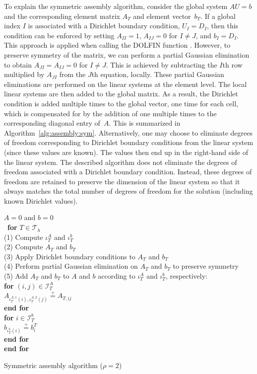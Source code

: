 To explain the symmetric assembly algorithm, consider the global
system $AU=b$ and the corresponding element matrix $A_T$ and element
vector~$b_T$. If a global index $I$ is associated with a Dirichlet
boundary condition, $U_I=D_I$, then this condition can be enforced by
setting $A_{II} = 1$, $A_{IJ} = 0$ for $I \neq J$, and $b_I =
D_I$. This approach is applied when calling the DOLFIN function
. However, to preserve symmetry of the matrix,
we can perform a partial Gaussian elimination to obtain $A_{JI} =
A_{IJ} = 0$ for $I \ne J$. This is achieved by subtracting the $I$th
row multiplied by $A_{JI}$ from the $J$th equation, locally. These
partial Gaussian eliminations are performed on the linear systems at
the element level. The local linear systems are then added to the
global matrix. As a result, the Dirichlet condition is added multiple
times to the global vector, one time for each cell, which is
compensated for by the addition of one multiple times to the
corresponding diagonal entry of~$A$. This is summarized in
Algorithm~\ref{alg:assembly:sym}. Alternatively, one may choose to
eliminate degrees of freedom corresponding to Dirichlet boundary
conditions from the linear system (since these values are known). The
values then end up in the right-hand side of the linear system. The
described algorithm does not eliminate the degrees of freedom
associated with a Dirichlet boundary condition. Instead, these degrees
of freedom are retained to preserve the dimension of the linear system
so that it always matches the total number of degrees of freedom for
the solution (including known Dirichlet values).

\begin{algorithm}
  \begin{tabbing}
    $A = 0$ and $b = 0$\\\
    \textbf{for}  {$T \in \mathcal{T}_h$}\\
    \tab (1) Compute $\iota^A_T$ and $\iota^b_T$  \\
    \tab (2) Compute $A_T$ and $b_T$ \\
    \tab (3) Apply Dirichlet boundary conditions to $A_T$ and $b_T$ \\
    \tab (4) Perform partial Gaussian elimination on $A_T$ and $b_T$ to preserve symmetry \\
    \tab (5) Add $A_T$ and $b_T$ to $A$ and $b$ according to $\iota^A_T$ and $\iota^b_T$, respectively: \\
    \tab \textbf{for} $(i,j) \in \mathcal{I}^A_T$ \\
    \tab \tab $A_{\iota^{A,1}_T(i), \iota^{A,2}_T(j)} \stackrel{+}{=} A_{T,ij}$ \\
    \tab \textbf{end for} \\
    \tab \textbf{for} $i \in \mathcal{I}^b_T$  \\
    \tab \tab $b_{\iota^b_T(i)} \stackrel{+}{=} b^T_i$  \\
    \tab \textbf{end for} \\
    \textbf{end for}
  \end{tabbing}
  \label{alg:assembly:sym}
  \caption{Symmetric assembly algorithm ($\rho = 2$)}
\end{algorithm}

